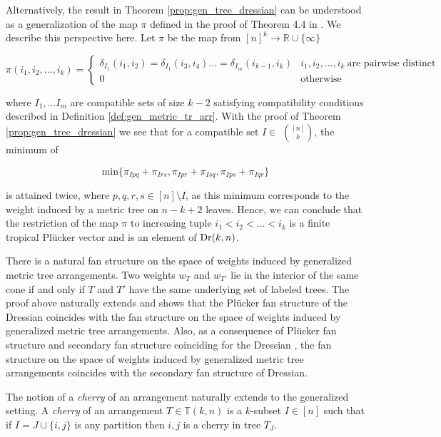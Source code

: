 \documentclass[12pt]{article}
\newcommand{\TT}{\mathbb{T}}
\DeclareMathOperator{\Dr}{\rm Dr}
\theoremstyle{plain}
\theoremstyle{definition}
\numberwithin{subcase}{case}
\begin{document}
Alternatively, the result in Theorem \ref{prop:gen_tree_dressian} can be understood as a generalization of the map $\pi$ defined in the proof of Theorem 4.4 in \cite{herrmann2009draw}. We describe this perspective here. Let $\pi$ be the map from $[n]^{k} \rightarrow \mathbb{R} \cup \{\infty\} $

\[ \pi(i_{1}, i_{2}, \hdots , i_{k}) = \begin{cases}
  \delta_{I_{1}}(i_{1},i_{2}) =  \delta_{I_{1}}(i_{3},i_{4}) \hdots = \delta_{I_{m}}(i_{k-1},i_{k}) &  i_{1}, i_{2}, \hdots , i_{k} \> \text{are pairwise distinct} \\    
  0 & \text{otherwise}    
\end{cases} \]

where $I_{1}, \hdots I_{m}$ are compatible sets of size $k-2$ satisfying compatibility conditions described in Definition \ref{def:gen_metric_tr_arr}. With the proof of Theorem \ref{prop:gen_tree_dressian} we see that for a compatible set $I \in$ $\binom{[n]}{k}$, the minimum of 

\[ \text{min} \{ \pi_{Ipq} + \pi_{Irs} , \pi_{Ipr} + \pi_{Isq} , \pi_{Ips} + \pi_{Iqr} \} \]

is attained twice, where $p,q,r,s \in [n] \setminus I$, as this minimum corresponds to the weight induced by a metric tree on $n-k+2$ leaves. Hence, we can conclude that the restriction of the map $\pi$ to increasing tuple $i_{1} < i_{2} < \hdots < i_{k}$ is a finite tropical Pl\"ucker vector and is an element of $\Dr(k,n)$.


There is a natural fan structure on the space of weights induced by generalized metric tree arrangements. Two weights $w_T$ and $w_{T'}$ lie in the interior of the same cone if and only if $T$ and $T'$ have the same underlying set of labeled trees. The proof above naturally extends and shows that the Pl\"ucker fan structure of the Dressian coincides with the fan structure on the space of weights induced by generalized metric tree arrangements. Also, as a consequence of Pl\"ucker fan structure and secondary fan structure coinciding for the Dressian \cite{olarte2019local}, the fan structure on the space of weights induced by generalized metric tree arrangements coincides with the secondary fan structure of Dressian. 

The notion of a \textit{cherry} of an arrangement naturally extends to the generalized setting. A \textit{cherry} of an arrangement $T \in \TT(k,n)$ is a $k$-subset $I \in [n]$ such that if $I = J \cup \{i,j\}$ is any partition then $i,j$ is a cherry in tree $T_J$.
\bigskip
\end{document}
